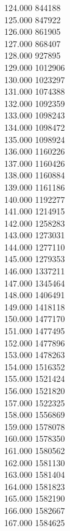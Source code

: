 { 124.000	844188 \\
 125.000	847922 \\
 126.000	861905 \\
 127.000	868407 \\
 128.000	927895 \\
 129.000	1012906 \\
 130.000	1023297 \\
 131.000	1074388 \\
 132.000	1092359 \\
 133.000	1098243 \\
 134.000	1098472 \\
 135.000	1098924 \\
 136.000	1160226 \\
 137.000	1160426 \\
 138.000	1160884 \\
 139.000	1161186 \\
 140.000	1192277 \\
 141.000	1214915 \\
 142.000	1258283 \\
 143.000	1273031 \\
 144.000	1277110 \\
 145.000	1279353 \\
 146.000	1337211 \\
 147.000	1345464 \\
 148.000	1406491 \\
 149.000	1418118 \\
 150.000	1477170 \\
 151.000	1477495 \\
 152.000	1477896 \\
 153.000	1478263 \\
 154.000	1516352 \\
 155.000	1521424 \\
 156.000	1521820 \\
 157.000	1522325 \\
 158.000	1556869 \\
 159.000	1578078 \\
 160.000	1578350 \\
 161.000	1580562 \\
 162.000	1581130 \\
 163.000	1581404 \\
 164.000	1581823 \\
 165.000	1582190 \\
 166.000	1582667 \\
 167.000	1584625 \\
}

